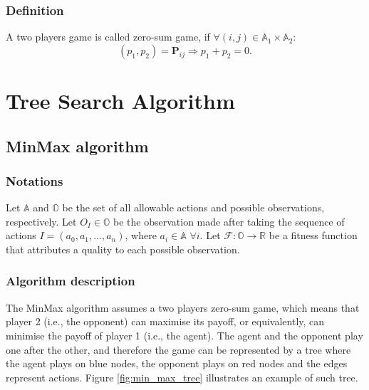 \documentclass[11pt,fleqn]{book} %
\begin{document}
\subsection*{Definition}

A two players game is called zero-sum game, if $\forall (i, j) \in \mathbb{A}_1 \times \mathbb{A}_2$:
$$(p_1,p_2) = \bm{P}_{ij} \Rightarrow p_1 + p_2 = 0.$$


\chapter{Tree Search Algorithm}

\section{MinMax algorithm} \label{sec:minmax}

\subsection*{Notations}

Let $\mathbb{A}$ and $\mathbb{O}$ be the set of all allowable actions and possible observations, respectively. Let $O_I \in \mathbb{O}$ be the observation made after taking the sequence of actions $I = (a_0, a_1, ..., a_n)$, where $a_i \in \mathbb{A} \,\, \forall i$. Let $\mathcal{F} : \mathbb{O} \rightarrow \mathbb{R}$ be a fitness function that attributes a quality to each possible observation.

\subsection*{Algorithm description}

The MinMax algorithm assumes a two players zero-sum game, which means that player 2 (i.e., the opponent) can maximise its payoff, or equivalently, can minimise the payoff of player 1 (i.e., the agent). The agent and the opponent play one after the other, and therefore the game can be represented by a tree where the agent plays on blue nodes, the opponent plays on red nodes and the edges represent actions. Figure \ref{fig:min_max_tree} illustrates an example of such tree.
\end{document}

